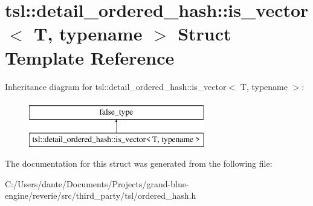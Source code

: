 \hypertarget{structtsl_1_1detail__ordered__hash_1_1is__vector}{}\section{tsl\+::detail\+\_\+ordered\+\_\+hash\+::is\+\_\+vector$<$ T, typename $>$ Struct Template Reference}
\label{structtsl_1_1detail__ordered__hash_1_1is__vector}
Inheritance diagram for tsl\+::detail\+\_\+ordered\+\_\+hash\+::is\+\_\+vector$<$ T, typename $>$\+:\begin{figure}[H]
\begin{center}
\leavevmode
\includegraphics[height=2.000000cm]{structtsl_1_1detail__ordered__hash_1_1is__vector}
\end{center}
\end{figure}


The documentation for this struct was generated from the following file\+:\begin{DoxyCompactItemize}
\item 
C\+:/\+Users/dante/\+Documents/\+Projects/grand-\/blue-\/engine/reverie/src/third\+\_\+party/tsl/ordered\+\_\+hash.\+h\end{DoxyCompactItemize}
